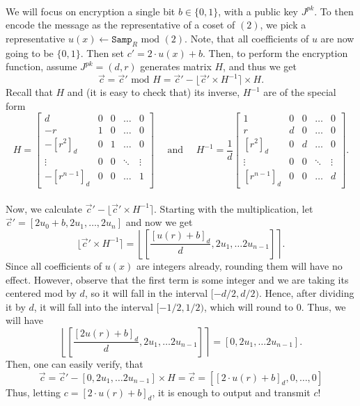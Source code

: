 \documentclass{article}
\theoremstyle{definition}
\theoremstyle{example}
\renewcommand{\mod}{\,\,\text{mod}\,\,}
\newcommand{\Samp}{\texttt{Samp}}
\begin{document}
\paragraph{} We will focus on encryption a single bit $b \in \{0, 1\}$, with a
public key $J^{pk}$. To then encode the message as the representative of a coset
of $(2)$, we pick a representative $u(x) \leftarrow \Samp_R \mod (2)$. Note, that all
coefficients of $u$ are now going to be $\{0, 1\}$. Then set $c' = 2\cdot u(x) + b$.
Then, to perform the encryption function, assume $J^{pk} = (d, r)$ generates
matrix $H$, and thus we get
\[
  \vec{c} = \vec{c}' \mod H = \vec{c}' - \lfloor \vec{c}' \times H^{-1} \rceil
  \times H.
\]
Recall that $H$ and (it is easy to check that) its inverse, $H^{-1}$ are of the
special form
\[
  H = \begin{bmatrix}
    d & 0 & 0 &\hdots &0 \\
    -r & 1 & 0 &\hdots &0 \\
    -[r^2]_d & 0 & 1 & \hdots& 0 \\
    \vdots & 0 & 0 & \ddots & \vdots \\
    -[r^{n - 1}]_d & 0 & 0 & \hdots & 1
  \end{bmatrix}
  \quad\text{ and }\quad
  H^{-1} = \frac{1}{d}\begin{bmatrix}
    1 & 0 & 0 &\hdots &0 \\
    r & d & 0 &\hdots &0 \\
    [r^2]_d & 0 & d & \hdots& 0 \\
    \vdots & 0 & 0 & \ddots & \vdots \\
    [r^{n - 1}]_d & 0 & 0 & \hdots & d
  \end{bmatrix}.
\]
\paragraph{} Now, we calculate $\vec{c}' - \lfloor \vec{c}' \times H^{-1} \rceil$.
Starting with the multiplication, let $\vec{c}' = [2u_0 + b, 2u_1, \hdots,
2u_n]$ and now we get
\[
  \lfloor \vec{c}' \times H^{-1} \rceil = \left\lfloor\left[\frac{[u(r) + b]_d}d , 2u_1,
    \hdots 2u_{n-1}\right] \right\rceil.
\]
Since all coefficients of $u(x)$ are integers already, rounding them will have
no effect. However, observe that the first term is some integer and we are
taking its centered mod by $d$, so it will fall in the interval $[-d/2, d/2)$.
Hence, after dividing it by $d$, it will fall into the interval $[-1/2, 1/2)$,
which will round to $0$. Thus, we will have
\[
  \left\lfloor\left[\frac{[2u(r) + b]_d}d , 2u_1,\hdots 2u_{n-1}\right]
  \right\rceil = [ 0 , 2u_1,\hdots 2u_{n-1}].
\]
Then, one can easily verify, that  
\[
  \vec{c} = \vec{c}' - [ 0 , 2u_1,\hdots 2u_{n-1}] \times H = \vec{c} = [[2\cdot
  u(r) + b]_d, 0, \hdots, 0]
\]
Thus, letting $c = [2\cdot u(r) + b]_d$, it is enough to output and transmit $c$!
\end{document}
